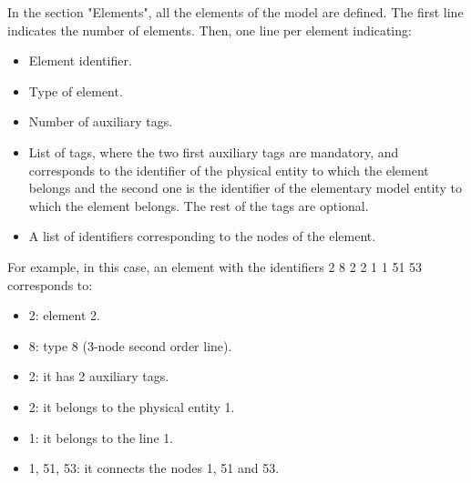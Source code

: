 \documentclass[a4]{article}
\begin{document}
In the section "Elements", all the elements of the model are defined. The first line indicates the number of elements. Then, one line per element indicating:

\begin{itemize}
	\item Element identifier.
	\item Type of element.
	\item Number of auxiliary tags.
	\item List of tags, where the two first auxiliary tags are mandatory, and corresponds to the identifier of the physical entity to which the element belongs and the second one is the identifier of the elementary model entity to which the element belongs. The rest of the tags are optional.
	\item A list of identifiers corresponding to the nodes of the element.
\end{itemize}

For example, in this case, an element with the identifiers 2 8 2 2 1 1 51 53 corresponds to:

\begin{itemize}
	\item 2: element 2.
	\item 8: type 8 (3-node second order line).
	\item 2: it has 2 auxiliary tags.
	\item 2: it belongs to the physical entity 1.
	\item 1: it belongs to the line 1.
	\item 1, 51, 53: it connects the nodes 1, 51 and 53.
\end{itemize} 
\end{document}
